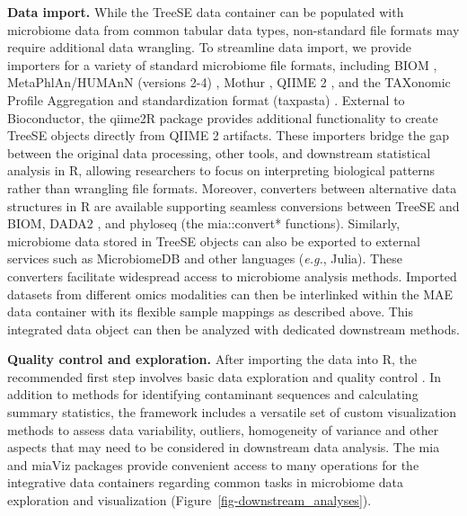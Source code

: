 \documentclass[
  sn-nature,
]{sn-jnl}
\begin{document}
\textbf{Data import.} While the TreeSE data container can be populated
with microbiome data from common tabular data types, non-standard file
formats may require additional data wrangling. To streamline data
import, we provide importers for a variety of standard microbiome file
formats, including BIOM \citep{mcdonald2012}, MetaPhlAn/HUMAnN (versions
2-4) \citep{beghini2021}, Mothur \citep{schloss2009}, QIIME 2
\citep{bolyen2019}, and the TAXonomic Profile Aggregation and
standardization format (taxpasta) \citep{beber2023}. External to
Bioconductor, the qiime2R package provides additional functionality to
create TreeSE objects directly from QIIME 2 artifacts. These importers
bridge the gap between the original data processing, other tools, and
downstream statistical analysis in R, allowing researchers to focus on
interpreting biological patterns rather than wrangling file formats.
Moreover, converters between alternative data structures in R are
available supporting seamless conversions between TreeSE and BIOM, DADA2
\citep{callahan2016}, and phyloseq (the mia::convert* functions).
Similarly, microbiome data stored in TreeSE objects can also be exported
to external services such as MicrobiomeDB \citep{oliveira2018} and other
languages (\emph{e.g.}, Julia). These converters facilitate widespread
access to microbiome analysis methods. Imported datasets from different
omics modalities can then be interlinked within the MAE data container
with its flexible sample mappings as described above. This integrated
data object can then be analyzed with dedicated downstream methods.

\textbf{Quality control and exploration.} After importing the data into
R, the recommended first step involves basic data exploration and
quality control \citep{zuur2010}. In addition to methods for identifying
contaminant sequences and calculating summary statistics, the framework
includes a versatile set of custom visualization methods to assess data
variability, outliers, homogeneity of variance and other aspects that
may need to be considered in downstream data analysis. The mia and
miaViz packages provide convenient access to many operations for the
integrative data containers regarding common tasks in microbiome data
exploration and visualization (Figure~\ref{fig-downstream_analyses}).
\end{document}
